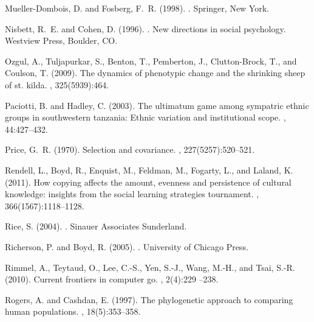 Mueller-Dombois, D. and Fosberg, F.~R. (1998).
.
\newblock Springer, New York.

Nisbett, R.~E. and Cohen, D. (1996).
.
\newblock New directions in social psychology. Westview Press, Boulder, CO.

Ozgul, A., Tuljapurkar, S., Benton, T., Pemberton, J., Clutton-Brock, T., and
  Coulson, T. (2009).
\newblock The dynamics of phenotypic change and the shrinking sheep of st.
  kilda.
, 325(5939):464.

Paciotti, B. and Hadley, C. (2003).
\newblock The ultimatum game among sympatric ethnic groups in southwestern
  tanzania: Ethnic variation and institutional scope.
, 44:427--432.

Price, G.~R. (1970).
\newblock Selection and covariance.
, 227(5257):520--521.

Rendell, L., Boyd, R., Enquist, M., Feldman, M., Fogarty, L., and Laland, K.
  (2011).
\newblock How copying affects the amount, evenness and persistence of cultural
  knowledge: insights from the social learning strategies tournament.
, 366(1567):1118--1128.

Rice, S. (2004).
.
\newblock Sinauer Associates Sunderland.

Richerson, P. and Boyd, R. (2005).
.
\newblock University of Chicago Press.

Rimmel, A., Teytaud, O., Lee, C.-S., Yen, S.-J., Wang, M.-H., and Tsai, S.-R.
  (2010).
\newblock Current frontiers in computer go.
, 2(4):229 --238.

Rogers, A. and Cashdan, E. (1997).
\newblock The phylogenetic approach to comparing human populations.
, 18(5):353--358.

